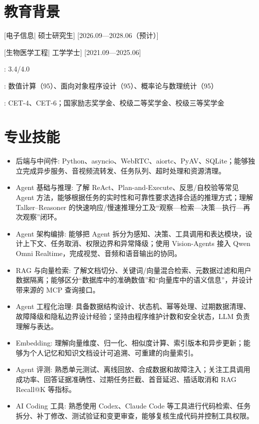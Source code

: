 \documentclass{resume}
\begin{document}

\ResumeTitle

\section{教育背景}
[\textnormal{电子信息|} 硕士研究生]
[2026.09—2028.06（预计）]

[\textnormal{生物医学工程|} 工学学士]
[2021.09—2025.06]

: 3.4/4.0

: 数值计算（95）、面向对象程序设计（95）、概率论与数理统计（95）

: CET-4、CET-6；国家励志奖学金、校级二等奖学金、校级三等奖学金

\section{专业技能}
\begin{itemize}[leftmargin=0pt,label={},labelsep=0pt,itemindent=0pt]
  \item[] {\heiti 后端与中间件}: Python、asyncio、WebRTC、aiortc、PyAV、SQLite；能够独立完成异步服务、音视频流转发、任务队列、超时处理和资源清理。
  \item[] {\heiti Agent 基础与推理}: 了解 ReAct、Plan-and-Execute、反思/自校验等常见 Agent 方法，能够根据任务的实时性和可靠性要求选择合适的推理方式；理解 Talker--Reasoner 的快速响应/慢速推理分工及“观察—检索—决策—执行—再次观察”闭环。
  \item[] {\heiti Agent 架构编排}: 能够把 Agent 拆分为感知、决策、工具调用和表达模块，设计上下文、任务取消、权限边界和异常降级；使用 Vision-Agents 接入 Qwen Omni Realtime，完成视觉、音频和语音输出的协同。
  \item[] {\heiti RAG 与向量检索}: 了解文档切分、关键词/向量混合检索、元数据过滤和用户数据隔离；能够区分“数据库中的准确数值”和“向量库中的语义信息”，并设计带来源的 MCP 查询接口。
  \item[] {\heiti Agent 工程化治理}: 具备数据结构设计、状态机、幂等处理、过期数据清理、故障降级和隐私边界设计经验；坚持由程序维护计数和安全状态，LLM 负责理解与表达。
  \item[] {\heiti Embedding}: 理解向量维度、归一化、相似度计算、索引版本和异步更新；能够为个人记忆和知识文档设计可追溯、可重建的向量索引。
  \item[] {\heiti Agent 评测}: 熟悉单元测试、离线回放、合成数据和故障注入；关注工具调用成功率、回答证据准确性、过期任务拦截、首音延迟、插话取消和 RAG Recall@K 等指标。
  \item[] {\heiti AI Coding 工具}: 熟悉使用 Codex、Claude Code 等工具进行代码检索、任务拆分、补丁修改、测试验证和变更审查，能够复核生成代码并控制工具权限。
\end{itemize}
\end{document}
